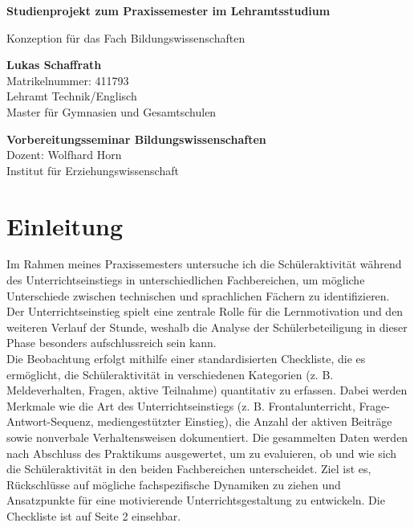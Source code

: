 \documentclass[12pt]{article}
\begin{document}
    \begin{center}
        \large
        \textbf{Studienprojekt zum Praxissemester im Lehramtsstudium}
            
        Konzeption für das Fach Bildungswissenschaften
            
        \textbf{Lukas Schaffrath}\\
        Matrikelnummer: 411793\\
        Lehramt Technik/Englisch\\
        Master für Gymnasien und Gesamtschulen
            
        \textbf{Vorbereitungsseminar Bildungswissenschaften}\\            
        Dozent: Wolfhard Horn\\
        Institut für Erziehungswissenschaft\\
        
    \end{center}



\vspace{2cm}
\setcounter{page}{1}
\pagestyle{maintext}

\section{Einleitung}
Im Rahmen meines Praxissemesters untersuche ich die Schüleraktivität während des Unterrichtseinstiegs in unterschiedlichen Fachbereichen, um mögliche Unterschiede zwischen technischen und sprachlichen Fächern zu identifizieren. Der Unterrichtseinstieg spielt eine zentrale Rolle für die Lernmotivation und den weiteren Verlauf der Stunde, weshalb die Analyse der Schülerbeteiligung in dieser Phase besonders aufschlussreich sein kann.\\

Die Beobachtung erfolgt mithilfe einer standardisierten Checkliste, die es ermöglicht, die Schüleraktivität in verschiedenen Kategorien (z. B. Meldeverhalten, Fragen, aktive Teilnahme) quantitativ zu erfassen. Dabei werden Merkmale wie die Art des Unterrichtseinstiegs (z. B. Frontalunterricht, Frage-Antwort-Sequenz, mediengestützter Einstieg), die Anzahl der aktiven Beiträge sowie nonverbale Verhaltensweisen dokumentiert. Die gesammelten Daten werden nach Abschluss des Praktikums ausgewertet, um zu evaluieren, ob und wie sich die Schüleraktivität in den beiden Fachbereichen unterscheidet. Ziel ist es, Rückschlüsse auf mögliche fachspezifische Dynamiken zu ziehen und Ansatzpunkte für eine motivierende Unterrichtsgestaltung zu entwickeln. Die Checkliste ist auf Seite 2 einsehbar.
\end{document}
